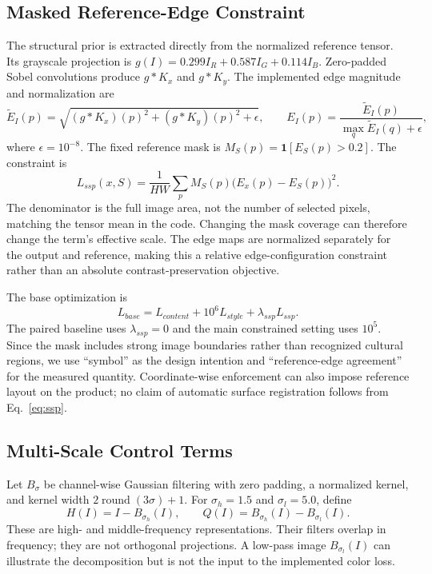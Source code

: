 \subsection{Masked Reference-Edge Constraint}
The structural prior is extracted directly from the normalized reference tensor. Its grayscale projection is $g(I)=0.299I_R+0.587I_G+0.114I_B$. Zero-padded Sobel convolutions produce $g* K_x$ and $g*K_y$. The implemented edge magnitude and normalization are
\begin{equation}
\widetilde E_I(p)=\sqrt{(g*K_x)(p)^2+(g*K_y)(p)^2+\epsilon},\qquad
E_I(p)=\frac{\widetilde E_I(p)}{\max_q\widetilde E_I(q)+\epsilon},
\end{equation}
where $\epsilon=10^{-8}$. The fixed reference mask is $M_S(p)=\mathbf{1}[E_S(p)>0.2]$. The constraint is
\begin{equation}
L_{ssp}(x,S)=\frac{1}{HW}\sum_{p}M_S(p)\big(E_x(p)-E_S(p)\big)^2.
\label{eq:ssp}
\end{equation}
The denominator is the full image area, not the number of selected pixels, matching the tensor mean in the code. Changing the mask coverage can therefore change the term's effective scale. The edge maps are normalized separately for the output and reference, making this a relative edge-configuration constraint rather than an absolute contrast-preservation objective.

The base optimization is
\begin{equation}
L_{base}=L_{content}+10^6 L_{style}+\lambda_{ssp}L_{ssp}.
\end{equation}
The paired baseline uses $\lambda_{ssp}=0$ and the main constrained setting uses $10^5$. Since the mask includes strong image boundaries rather than recognized cultural regions, we use ``symbol'' as the design intention and ``reference-edge agreement'' for the measured quantity. Coordinate-wise enforcement can also impose reference layout on the product; no claim of automatic surface registration follows from Eq.~\ref{eq:ssp}.

\subsection{Multi-Scale Control Terms}
Let $B_\sigma$ be channel-wise Gaussian filtering with zero padding, a normalized kernel, and kernel width $2\operatorname{round}(3\sigma)+1$. For $\sigma_h=1.5$ and $\sigma_l=5.0$, define
\begin{equation}
H(I)=I-B_{\sigma_h}(I),\qquad
Q(I)=B_{\sigma_h}(I)-B_{\sigma_l}(I).
\end{equation}
These are high- and middle-frequency representations. Their filters overlap in frequency; they are not orthogonal projections. A low-pass image $B_{\sigma_l}(I)$ can illustrate the decomposition but is not the input to the implemented color loss.

